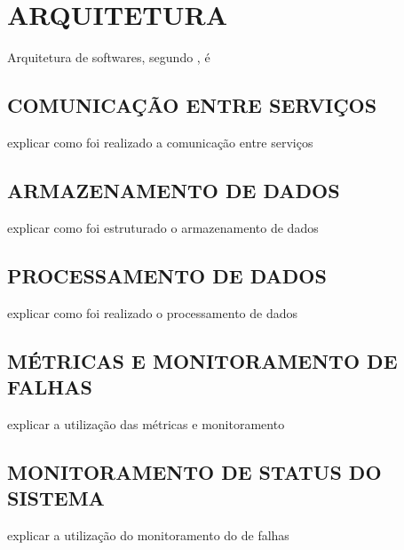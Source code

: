 \chapter{ARQUITETURA}
\label{chp:arquitetura}

Arquitetura de softwares, segundo , é 

\section{COMUNICAÇÃO ENTRE SERVIÇOS}

explicar como foi realizado a comunicação entre serviços

\section{ARMAZENAMENTO DE DADOS}

explicar como foi estruturado o armazenamento de dados

\section{PROCESSAMENTO DE DADOS}

explicar como foi realizado o processamento de dados

\section{MÉTRICAS E MONITORAMENTO DE FALHAS}

explicar a utilização das métricas e monitoramento

\section{MONITORAMENTO DE STATUS DO SISTEMA}

explicar a utilização do monitoramento do de falhas
